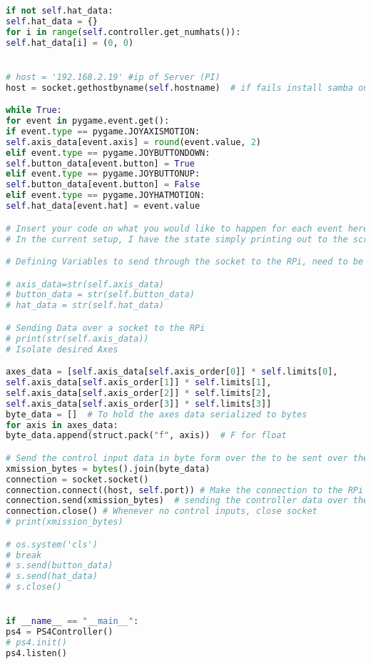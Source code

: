 \begin{lstlisting}[language=Python,caption={PS4Controller.py},label={lst:PS4Controller.py}]
if not self.hat_data:
self.hat_data = {}
for i in range(self.controller.get_numhats()):
self.hat_data[i] = (0, 0)


# host = '192.168.2.19' #ip of Server (PI)
host = socket.gethostbyname(self.hostname)  # if fails install samba on pi and reboot

while True:
for event in pygame.event.get():
if event.type == pygame.JOYAXISMOTION:
self.axis_data[event.axis] = round(event.value, 2)
elif event.type == pygame.JOYBUTTONDOWN:
self.button_data[event.button] = True
elif event.type == pygame.JOYBUTTONUP:
self.button_data[event.button] = False
elif event.type == pygame.JOYHATMOTION:
self.hat_data[event.hat] = event.value

# Insert your code on what you would like to happen for each event here!
# In the current setup, I have the state simply printing out to the screen.

# Defining Variables to send through the socket to the RPi, need to be strings

# axis_data=str(self.axis_data)
# button_data = str(self.button_data)
# hat_data = str(self.hat_data)

# Sending Data over a socket to the RPi
# print(str(self.axis_data))
# Isolate desired Axes

axes_data = [self.axis_data[self.axis_order[0]] * self.limits[0],
self.axis_data[self.axis_order[1]] * self.limits[1],
self.axis_data[self.axis_order[2]] * self.limits[2],
self.axis_data[self.axis_order[3]] * self.limits[3]]
byte_data = []  # To hold the axes data serialized to bytes
for axis in axes_data:
byte_data.append(struct.pack("f", axis))  # F for float

# Send the control input data in byte form over the to be sent over the socket
xmission_bytes = bytes().join(byte_data)
connection = socket.socket()
connection.connect((host, self.port)) # Make the connection to the RPi
connection.send(xmission_bytes)  # sending the controller data over the port
connection.close() # Whenever no control inputs, close socket
# print(xmission_bytes)

# os.system('cls')
# break
# s.send(button_data)
# s.send(hat_data)
# s.close()


if __name__ == "__main__":
ps4 = PS4Controller()
# ps4.init()
ps4.listen()
\end{lstlisting}